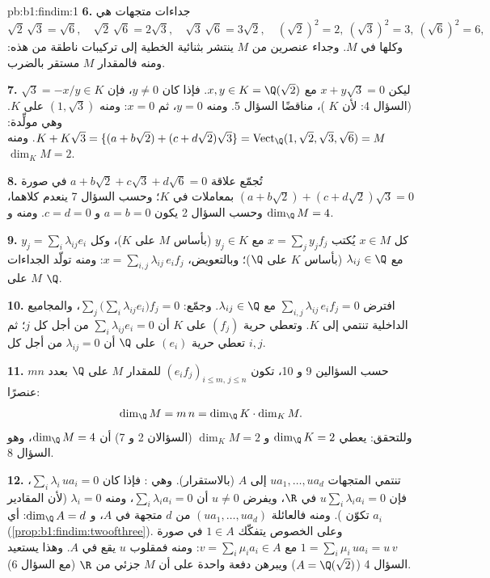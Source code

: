 \begin{solution}{pb:b1:findim:1}
\textbf{6.} جداءات متجهات  هي
\[
\sqrt2\,\sqrt3 = \sqrt6,\quad
\sqrt2\,\sqrt6 = 2\sqrt3,\quad
\sqrt3\,\sqrt6 = 3\sqrt2,\quad
(\sqrt2)^2 = 2,\ (\sqrt3)^2 = 3,\ (\sqrt6)^2 = 6,
\]
وكلها في $M$. وجداء عنصرين من $M$ ينتشر بثنائية
الخطية إلى تركيبات ناطقة من هذه: ومنه فالمقدار $M$ مستقر
بالضرب.

\textbf{7.} ليكن $x + y\sqrt3 = 0$ مع $x, y \in K = \Q(\sqrt2)$.
فإذا كان $y \neq 0$، فإن $\sqrt3 = -x/y \in K$ (السؤال 4: لأن $K$
)، مناقضًا السؤال 5. ومنه $y = 0$، ثم $x = 0$: ومنه $(1,
\sqrt3)$  على $K$. وهي مولِّدة: $K + K\sqrt3 =
\{(a + b\sqrt2) + (c + d\sqrt2)\sqrt3\} = \operatorname{Vect}_\Q
(1, \sqrt2, \sqrt3, \sqrt6) = M$. ومنه $\dim_K M = 2$.

\textbf{8.} تُجمّع علاقة $a + b\sqrt2 + c\sqrt3 + d\sqrt6 = 0$
في صورة $(a + b\sqrt2) + (c + d\sqrt2)\sqrt3 = 0$ بمعاملات
في $K$؛ وحسب السؤال 7 ينعدم كلاهما، وحسب السؤال 2
يكون $a = b = 0$ و $c = d = 0$. ومنه  و $\dim_\Q M
= 4$.

\textbf{9.} كل $x \in M$ يُكتب $x = \sum_j y_j f_j$ مع $y_j
\in K$ (بأساس $M$ على $K$)، وكل $y_j = \sum_i
\lambda_{ij} e_i$ مع $\lambda_{ij} \in \Q$ (بأساس $K$ على
$\Q$)؛ وبالتعويض، $x = \sum_{i,j} \lambda_{ij}\, e_i f_j$: ومنه
تولّد الجداءات $M$ على $\Q$.

\textbf{10.} افترض $\sum_{i,j} \lambda_{ij}\, e_i f_j = 0$ مع
$\lambda_{ij} \in \Q$. وجمّع: $\sum_j \bigl(\sum_i \lambda_{ij}
e_i\bigr) f_j = 0$، والمجاميع الداخلية تنتمي إلى $K$. وتعطي حرية
$(f_j)$ على $K$ أن $\sum_i \lambda_{ij} e_i = 0$ من أجل كل
$j$؛ ثم تعطي حرية $(e_i)$ على $\Q$ أن $\lambda_{ij} = 0$
من أجل كل $i, j$.

\textbf{11.} حسب السؤالين 9 و 10، تكون $(e_i f_j)_{i \leq m,\, j
\leq n}$  للمقدار $M$ على $\Q$ بعدد $mn$ عنصرًا:
\[
\dim_\Q M = m\,n = \dim_\Q K \cdot \dim_K M .
\]
وللتحقق: يعطي $\dim_\Q K = 2$ و $\dim_K M = 2$ (السؤالان 2 و 7)
أن $\dim_\Q M = 4$، وهو السؤال 8.

\textbf{12.} تنتمي المتجهات $u a_1, \dots, u a_d$ إلى $A$
(بالاستقرار). وهي : فإذا كان $\sum_i \lambda_i\, u a_i = 0$،
فإن $u \sum_i \lambda_i a_i = 0$ في $\R$، ويفرض $u \neq 0$ أن
$\sum_i \lambda_i a_i = 0$، ومنه $\lambda_i = 0$ (لأن المقادير $a_i$ تكوّن
). ومنه فالعائلة $(u a_1, \dots, u a_d)$  من $d$
متجهة في $A$، و $\dim_\Q A = d$: أي 
(\cref{prop:b1:findim:twoofthree}). وعلى الخصوص يتفكّك $1 \in A$
في صورة $1 = \sum_i \mu_i\, u a_i = u\,v$ مع $v = \sum_i
\mu_i a_i \in A$: ومنه فمقلوب $u$ يقع في $A$. وهذا يستعيد
السؤال 4 ($A = \Q(\sqrt2)$) ويبرهن دفعة واحدة على أن $M$
 جزئي من $\R$ (مع السؤال 6).


\end{solution}
